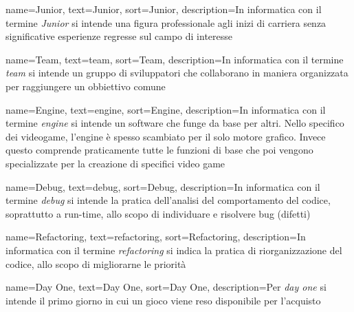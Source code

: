 
\renewcommand{\acronymname}{Acronimi e abbreviazioni}





{
	name=Junior,
	text=Junior,
	sort=Junior,
	description={In informatica con il termine \emph{Junior} si intende una figura professionale agli inizi di carriera senza significative esperienze regresse sul campo di interesse}
}

{
	name=Team,
	text=team,
	sort=Team,
	description={In informatica con il termine \emph{team} si intende un gruppo di sviluppatori che collaborano in maniera organizzata per raggiungere un obbiettivo comune}
}

{
	name=Engine,
	text=engine,
	sort=Engine,
	description={In informatica con il termine \emph{engine} si intende un software che funge da base per altri. Nello specifico dei videogame, l'engine è spesso scambiato per il solo motore grafico. Invece questo comprende praticamente tutte le funzioni di base che poi vengono specializzate per la creazione di specifici video game}
}

{
	name=Debug,
	text=debug,
	sort=Debug,
	description={In informatica con il termine \emph{debug} si intende la pratica dell'analisi del comportamento del codice, soprattutto a run-time, allo scopo di individuare e risolvere bug (difetti)}
}

{
	name=Refactoring,
	text=refactoring,
	sort=Refactoring,
	description={In informatica con il termine \emph{refactoring} si indica la pratica di riorganizzazione del codice, allo scopo di migliorarne le priorità}
}

{
	name=Day One,
	text=Day One,
	sort=Day One,
	description={Per \emph{day one} si intende il primo giorno in cui un gioco viene reso disponibile per l'acquisto}
}

